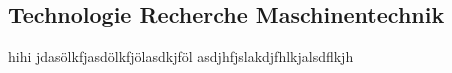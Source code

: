\documentclass[../main.tex]{subfiles}
\begin{document}
\subsection{Technologie Recherche Maschinentechnik}
hihi
jdasölkfjasdölkfjölasdkjföl
asdjhfjslakdjfhlkjalsdflkjh
\end{document}
